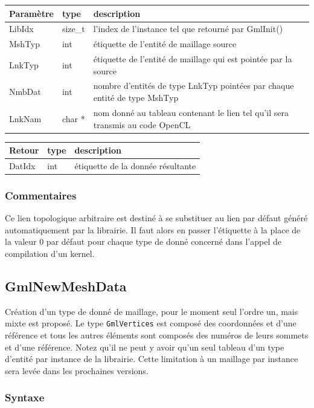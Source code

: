 \documentclass[a4paper,12pt]{article}
\begin{document}
\begin{tabular}{|m{2cm}|m{1.5cm}|m{10.5cm}|}
\hline
Paramètre  & type    & description \\
\hline
LibIdx     & size\_t & l'index de l'instance tel que retourné par GmlInit() \\
\hline
MshTyp     & int     & étiquette de l'entité de maillage source \\
\hline
LnkTyp     & int     & étiquette de l'entité de maillage qui est pointée par la source \\
\hline
NmbDat     & int     & nombre d'entités de type LnkTyp pointées par chaque entité de type MshTyp \\
\hline
LnkNam     & char *  & nom donné au tableau contenant le lien tel qu'il sera transmis au code OpenCL  \\
\hline
\end{tabular}

\medskip

\begin{tabular}{|m{2cm}|m{1.5cm}|m{10.5cm}|}
\hline
Retour     & type   & description \\
\hline
DatIdx     & int    & étiquette de la donnée résultante \\
\hline
\end{tabular}

\subsubsection*{Commentaires}
Ce lien topologique arbitraire est destiné à se substituer au lien par défaut généré automatiquement par la librairie.
Il faut alors en passer l'étiquette à la place de la valeur 0 par défaut pour chaque type de donné concerné dans l'appel de compilation d'un kernel.


\subsection{GmlNewMeshData}

Création d'un type de donné de maillage, pour le moment seul l'ordre un, mais mixte est proposé.
Le type {\tt GmlVertices} est composé des coordonnées et d'une référence et tous les autres éléments sont composés des numéros de leurs sommets et d'une référence.
Notez qu'il ne peut y avoir qu'un seul tableau d'un type d'entité par instance de la librairie.
Cette limitation à un maillage par instance sera levée dans les prochaines versions.

\subsubsection*{Syntaxe}
\end{document}
